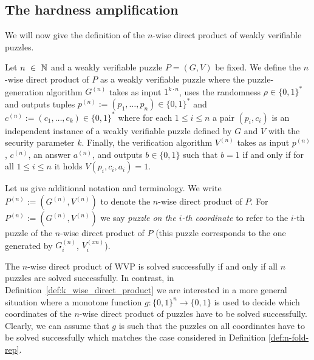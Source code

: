\subsection{The hardness amplification}
We will now give the definition of the $n$-wise direct product of weakly verifiable puzzles.
%
\begin{definition}
  \label{def:n-fold-rep}
  Let $n~\in~\mathbb{N}$ and a weakly verifiable puzzle $P = (G,V)$ be fixed.
  We define the $n$-wise direct product of $P$ as a weakly verifiable puzzle where the puzzle-generation algorithm
  $G^{(n)}$ takes as input $1^{k \cdot n}$, uses the randomness $\rho \in \{0,1\}^{*}$
  and outputs tuples $p^{(n)} := (p_1, \dotsc, p_n) \in \{0,1\}^{*}$ and $c^{(n)} := (c_1, \dotsc, c_k) \in \{0,1\}^{*}$
  where for each $1 \leq i \leq n$ a pair $(p_i, c_i)$ is an independent instance of a weakly verifiable puzzle defined by $G$ and $V$ with the security parameter $k$.
  Finally, the verification algorithm $V^{(n)}$ takes as input $p^{(n)}$, $c^{(n)}$, an answer $a^{(n)}$, and outputs $b \in \{0,1\}$
  such that $b = 1$ if and only if for all $1 \leq i \leq n$ it holds $V(p_i, c_i, a_i) = 1$.
 \end{definition}
%
Let us give additional notation and terminology. We write $P^{(n)} := (G^{(n)}, V^{(n)})$ to denote the $n$-wise direct product of $P$.
For $P^{(n) } := (G^{(n)},V^{(n)})$ we say \textit{puzzle on the $i$-th coordinate} to refer to the $i$-th puzzle of the $n$-wise direct product of $P$
(this puzzle corresponds to the one generated by $G^{(n)}_i$,  $V^{(xn)}_i$).

The $n$-wise direct product of WVP is solved successfully if and only if all $n$ puzzles are solved successfully.
In contrast, in Definition~\ref{def:k_wise_direct_product} we are interested in a more general situation where a monotone function $g: \{0,1\}^{n} \rightarrow \{0,1\}$
is used to decide which coordinates of the $n$-wise direct product of puzzles have to be solved successfully.
Clearly, we can assume that $g$ is such that the puzzles on all coordinates have to be solved successfully
which matches the case considered in Definition \ref{def:n-fold-rep}.

